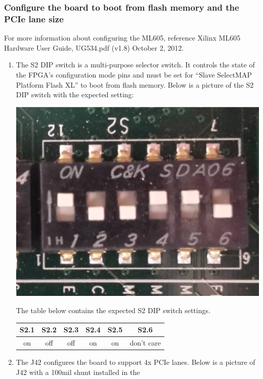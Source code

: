 \subsubsection{Configure the board to boot from flash memory and the PCIe lane size}
For more information about configuring the ML605, reference Xilinx ML605 Hardware User Guide, UG534.pdf (v1.8) October 2, 2012.
\begin{enumerate}
	\item The S2 DIP switch is a multi-purpose selector switch. It
	controls the state of the FPGA's configuration mode pins and
	must be set for ``Slave SelectMAP Platform Flash XL'' to boot
	from flash memory. Below is a picture of the S2 DIP switch with
	the expected setting:\\ \smallskip
	\begin{center}
		\includegraphics[scale=0.20]{ML605_S2.jpg}\par\smallskip
		The table below contains the expected S2 DIP switch
		settings.\par\smallskip
		\begin{tabular}{|c|c|c|c|c|c|}
		\hline
		\rowcolor{blue}S2.1 & S2.2 & S2.3 & S2.4 & S2.5 & S2.6 \\
		\hline
		on & off & off & on & on & don't care \\
		\hline
		\end{tabular}
	\end{center}\par\bigskip
	\item The J42 configures the board to support 4x PCIe lanes.
	Below is a picture of J42 with a 100mil shunt installed in the

\end{enumerate}
